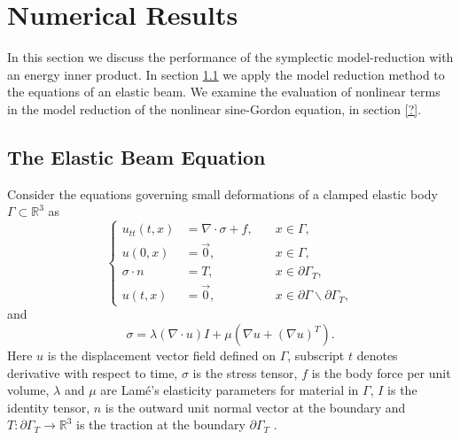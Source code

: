 \section{Numerical Results} \label{sec:res}
In this section we discuss the performance of the symplectic model-reduction with an energy inner product. In section \ref{sec:res.1} we apply the model reduction method to the equations of an elastic beam. We examine the evaluation of nonlinear terms in the model reduction of the nonlinear sine-Gordon equation, in section \ref{?}.

\subsection{The Elastic Beam Equation} \label{sec:res.1}
Consider the equations governing small deformations of a clamped elastic body $\Gamma\subset \mathbb R^{3}$ as 
\begin{equation} \label{eq:res.1}
\left\{
\begin{aligned}
	u_{tt}(t,x) &= \nabla \cdot \sigma + f, \quad & x\in \Gamma, \\
	u(0,x) &= \vec 0, & x\in \Gamma,\\
	\sigma \cdot n &= T, & x \in \partial \Gamma_T,\\
	u(t,x) &= \vec 0, & x \in\partial \Gamma \backslash \partial \Gamma_T,
\end{aligned}
\right.
\end{equation}
and
\begin{equation}  \label{eq:res.2}
	\sigma = \lambda (\nabla \cdot u) I + \mu(\nabla u + (\nabla u)^T).
\end{equation}
Here $u$ is the displacement vector field defined on $\Gamma$, subscript $t$ denotes derivative with respect to time, $\sigma$ is the stress tensor, $f$ is the body force per unit volume, $\lambda$ and $\mu$ are Lam\'e's elasticity parameters for material in $\Gamma$, $I$ is the identity tensor, $n$ is the outward unit normal vector at the boundary and $T:\partial \Gamma_T \to \mathbb R^3$ is the traction at the boundary $\partial \Gamma_T$ \cite{langtangen2017solving}.

